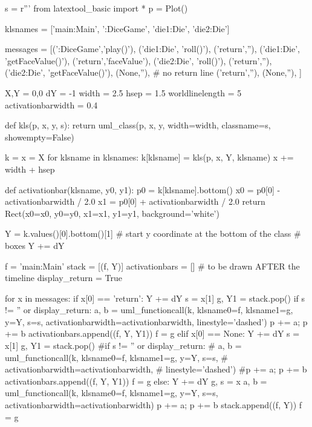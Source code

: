 

\begin{python}
s = r'''
from latextool_basic import *
p = Plot()

klsnames = ['main:Main', ':DiceGame', 'die1:Die', 'die2:Die']

messages = [(':DiceGame','play()'),
            ('die1:Die', 'roll()'),
            ('return',''),
            ('die1:Die', 'getFaceValue()'),
            ('return','faceValue'),
            ('die2:Die', 'roll()'),
            ('return',''),
            ('die2:Die', 'getFaceValue()'),
            (None,''), # no return line
            ('return',''),
            (None,''), 
           ]

X,Y = 0,0
dY = -1
width = 2.5
hsep = 1.5
worldlinelength = 5
activationbarwidth = 0.4

def kls(p, x, y, s):
    return uml_class(p, x, y, width=width, classname=s, showempty=False)

k = {}
x = X
for klsname in klsnames:
    k[klsname] = kls(p, x, Y, klsname)
    x += width + hsep
    
def activationbar(klsname, y0, y1):
    p0 = k[klsname].bottom()
    x0 = p0[0] - activationbarwidth / 2.0
    x1 = p0[0] + activationbarwidth / 2.0 
    return Rect(x0=x0, y0=y0, x1=x1, y1=y1, background='white')

Y = k.values()[0].bottom()[1] # start y coordinate at the bottom of the class
                              # boxes
Y += dY

f = 'main:Main'
stack = [(f, Y)]
activationbars = [] # to be drawn AFTER the timeline
display_return = True

for x in messages:
    if x[0] == 'return':
        Y += dY
        s = x[1]
        g, Y1 = stack.pop()
        if s != '' or display_return:
            a, b = uml_functioncall(k, klsname0=f, klsname1=g, y=Y, s=s,
                   activationbarwidth=activationbarwidth,
                   linestyle='dashed')
        p += a; p += b
        activationbars.append((f, Y, Y1))
        f = g
    elif x[0] == None:
        Y += dY
        s = x[1]
        g, Y1 = stack.pop()
        #if s != '' or display_return:
        #    a, b = uml_functioncall(k, klsname0=f, klsname1=g, y=Y, s=s,
        #           activationbarwidth=activationbarwidth,
        #           linestyle='dashed')
        #p += a; p += b
        activationbars.append((f, Y, Y1))
        f = g
    else:
        Y += dY
        g, s = x
        a, b = uml_functioncall(k, klsname0=f, klsname1=g, y=Y, s=s,
               activationbarwidth=activationbarwidth)
        p += a; p += b
        stack.append((f, Y))
        f = g


\end{python}
